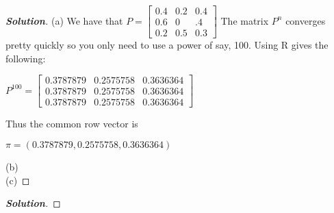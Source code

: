 \documentclass[12pt]{book}
\newenvironment{problem}[2][Problem]{\begin{trivlist}
\item[\hskip \labelsep {\bfseries #1}\hskip \labelsep {\bfseries #2.}]}{\end{trivlist}}
\newenvironment{solution}
               {\let\oldqedsymbol=\qedsymbol
                \renewcommand{\qedsymbol}{$\square$}
                \begin{proof}[\bfseries\upshape Solution]}
               {\end{proof}
                \renewcommand{\qedsymbol}{\oldqedsymbol}}
\begin{document}
\begin{problem}{1.3}
\end{problem}
\begin{solution}

(a) We have that $P = \begin{bmatrix}
    0.4 & 0.2 & 0.4 \\
    0.6 & 0 & .4 \\
    0.2 & 0.5 & 0.3
\end{bmatrix}$
The matrix $P^n$ converges pretty quickly so you only need to use a power of say, 100. Using R gives the following: \\
\begin{center}
$P^{100} = \begin{bmatrix}
    0.3787879 & 0.2575758 & 0.3636364 \\
    0.3787879 & 0.2575758 & 0.3636364 \\
    0.3787879 & 0.2575758 & 0.3636364 
\end{bmatrix}$
\end{center} 
Thus the common row vector is \\
\begin{center}
$\pi = (0.3787879,0.2575758,0.3636364)$
\end{center}

(b) \\

(c)
\end{solution}

\begin{problem}{1.4}
\end{problem}
\begin{solution}
\end{solution}
\end{document}
